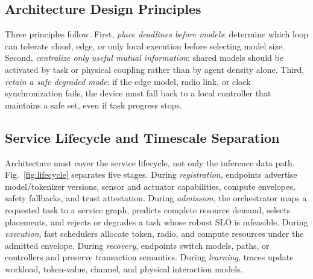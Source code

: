 \documentclass[letterpaper,journal]{IEEEtran}
\begin{document}
\subsection{Architecture Design Principles}
Three principles follow. First, \emph{place deadlines before models}: determine
which loop can tolerate cloud, edge, or only local execution before selecting
model size. Second, \emph{centralize only useful mutual information}: shared
models should be activated by task or physical coupling rather than by agent
density alone. Third, \emph{retain a safe degraded mode}: if the edge model,
radio link, or clock synchronization fails, the device must fall back to a
local controller that maintains a safe set, even if task progress stops.

\subsection{Service Lifecycle and Timescale Separation}
Architecture must cover the service lifecycle, not only the inference data
path. Fig.~\ref{fig:lifecycle} separates five stages. During
\emph{registration}, endpoints advertise model/tokenizer versions, sensor and
actuator capabilities, compute envelopes, safety fallbacks, and trust
attestation. During \emph{admission}, the orchestrator maps a requested task
to a service graph, predicts complete resource demand, selects placements,
and rejects or degrades a task whose robust SLO is infeasible. During
\emph{execution}, fast schedulers allocate token, radio, and compute resources
under the admitted envelope. During \emph{recovery}, endpoints switch models,
paths, or controllers and preserve transaction semantics. During
\emph{learning}, traces update workload, token-value, channel, and physical
interaction models.
\end{document}
